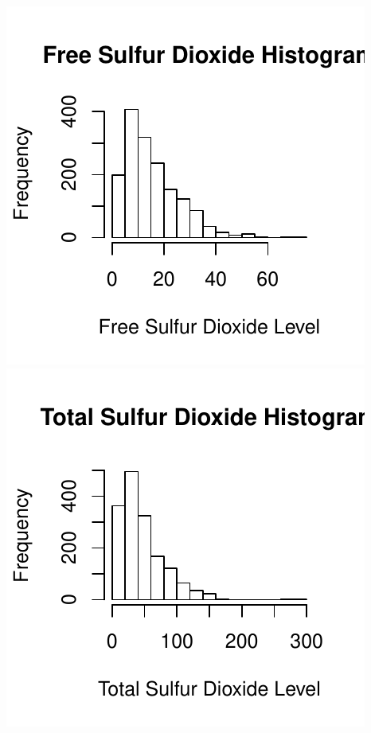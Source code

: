 \documentclass[]{article}
\begin{document}
\includegraphics{Project_files/figure-latex/unnamed-chunk-18-5.pdf}
\includegraphics{Project_files/figure-latex/unnamed-chunk-18-6.pdf}
\end{document}

